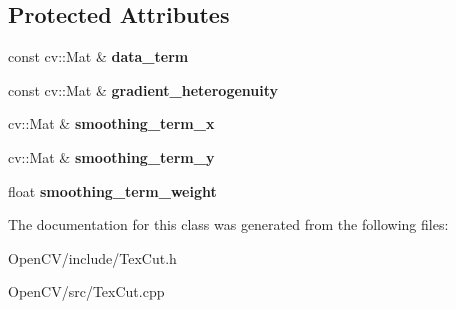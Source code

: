 \subsection*{Protected Attributes}
\begin{DoxyCompactItemize}
\item 
\hypertarget{classskl_1_1_parallel_add_gradient_heterogenuity_a0f44d68f3570ffddac3f19db27e70975}{}\label{classskl_1_1_parallel_add_gradient_heterogenuity_a0f44d68f3570ffddac3f19db27e70975} 
const cv\+::\+Mat \& {\bfseries data\+\_\+term}
\item 
\hypertarget{classskl_1_1_parallel_add_gradient_heterogenuity_acc07e5bd2e5b6cd1e79fdd69612aaccf}{}\label{classskl_1_1_parallel_add_gradient_heterogenuity_acc07e5bd2e5b6cd1e79fdd69612aaccf} 
const cv\+::\+Mat \& {\bfseries gradient\+\_\+heterogenuity}
\item 
\hypertarget{classskl_1_1_parallel_add_gradient_heterogenuity_a17765db83b342f0eb47d4bbf6b767b35}{}\label{classskl_1_1_parallel_add_gradient_heterogenuity_a17765db83b342f0eb47d4bbf6b767b35} 
cv\+::\+Mat \& {\bfseries smoothing\+\_\+term\+\_\+x}
\item 
\hypertarget{classskl_1_1_parallel_add_gradient_heterogenuity_aafa6aa99d6a4740d51d5426ed8028494}{}\label{classskl_1_1_parallel_add_gradient_heterogenuity_aafa6aa99d6a4740d51d5426ed8028494} 
cv\+::\+Mat \& {\bfseries smoothing\+\_\+term\+\_\+y}
\item 
\hypertarget{classskl_1_1_parallel_add_gradient_heterogenuity_ab048e3c50d479c3d802e95f90e5386e2}{}\label{classskl_1_1_parallel_add_gradient_heterogenuity_ab048e3c50d479c3d802e95f90e5386e2} 
float {\bfseries smoothing\+\_\+term\+\_\+weight}
\end{DoxyCompactItemize}


The documentation for this class was generated from the following files\+:\begin{DoxyCompactItemize}
\item 
Open\+C\+V/include/Tex\+Cut.\+h\item 
Open\+C\+V/src/Tex\+Cut.\+cpp\end{DoxyCompactItemize}
